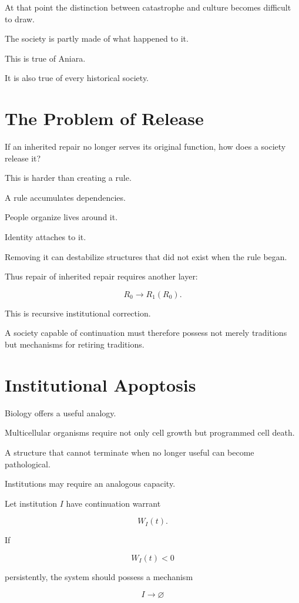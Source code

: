 \documentclass[11pt,oneside]{book}
\theoremstyle{definition}
\theoremstyle{remark}
\begin{document}
At that point the distinction between catastrophe and culture becomes difficult to draw.

The society is partly made of what happened to it.

This is true of Aniara.

It is also true of every historical society.

\section{The Problem of Release}

If an inherited repair no longer serves its original function, how does a society release it?

This is harder than creating a rule.

A rule accumulates dependencies.

People organize lives around it.

Identity attaches to it.

Removing it can destabilize structures that did not exist when the rule began.

Thus repair of inherited repair requires another layer:

\[
R_0
\rightarrow
R_1(R_0).
\]

This is recursive institutional correction.

A society capable of continuation must therefore possess not merely traditions but mechanisms for retiring traditions.

\section{Institutional Apoptosis}

Biology offers a useful analogy.

Multicellular organisms require not only cell growth but programmed cell death.

A structure that cannot terminate when no longer useful can become pathological.

Institutions may require an analogous capacity.

Let institution \(I\) have continuation warrant

\[
W_I(t).
\]

If

\[
W_I(t)<0
\]

persistently, the system should possess a mechanism

\[
I\rightarrow\varnothing
\]
\end{document}
